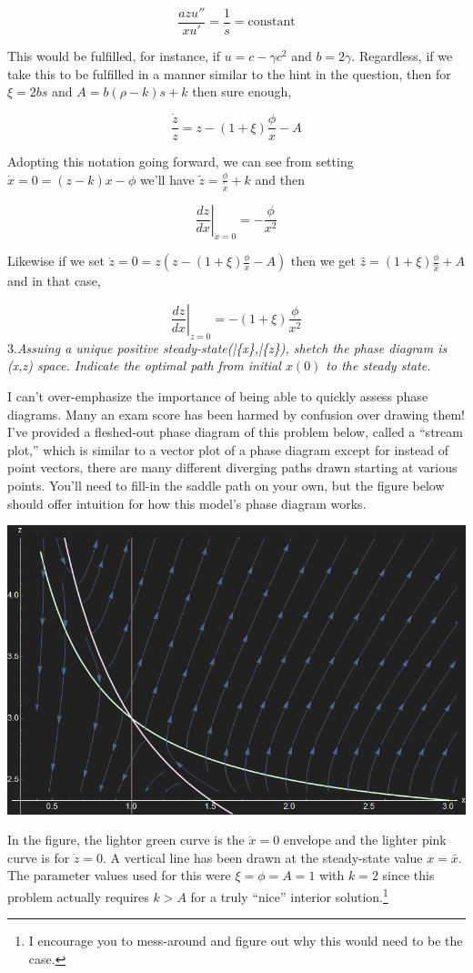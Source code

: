 \documentclass[
]{article}
\begin{document}
\[ \frac{azu''}{xu'} = \frac{1}{s} = \text{constant}\]

This would be fulfilled, for instance, if \(u = c - \gamma c^2\) and
\(b = 2\gamma\). Regardless, if we take this to be fulfilled in a manner
similar to the hint in the question, then for \(\xi = 2bs\) and
\(A=b(\rho - k)s + k\) then sure enough,

\[\frac{\dot{z}}{z} = z - (1+\xi)\frac{\phi}{x} - A\]

Adopting this notation going forward, we can see from setting
\(\dot{x} = 0 = (z - k)x - \phi\) we'll have
\(\tilde{z}= \frac{\phi}{\tilde{x}} + k\) and then

\[ \left. \frac{dz}{dx} \right\rvert_{\dot{x} = 0} = -\frac{\phi}{x^2}\]

Likewise if we set \(\dot{z} = 0 = z(z - (1+\xi)\frac{\phi}{x} - A)\)
then we get \(\hat{z}= (1+\xi)\frac{\phi}{\hat{x}} + A\) and in that
case,

\[ \left. \frac{dz}{dx} \right\rvert_{\dot{z} = 0} = -(1+\xi)\frac{\phi}{x^2}\]
3.\emph{Assuing a unique positive steady-state(\bar\{x\},\bar\{z\}),
shetch the phase diagram is (x,z) space. Indicate the optimal path from
initial \(x(0)\) to the steady state.}

I can't over-emphasize the importance of being able to quickly assess
phase diagrams. Many an exam score has been harmed by confusion over
drawing them! I've provided a fleshed-out phase diagram of this problem
below, called a ``stream plot,'' which is similar to a vector plot of a
phase diagram except for instead of point vectors, there are many
different diverging paths drawn starting at various points. You'll need
to fill-in the saddle path on your own, but the figure below should
offer intuition for how this model's phase diagram works.

\begin{center}\includegraphics[width=0.8\linewidth,height=0.8\textheight]{phaseplot_dark} \end{center}

In the figure, the lighter green curve is the \(\dot{x} = 0\) envelope
and the lighter pink curve is for \(\dot{z}=0\). A vertical line has
been drawn at the steady-state value \(x=\bar{x}\). The parameter values
used for this were \(\xi = \phi = A = 1\) with \(k = 2\) since this
problem actually requires \(k > A\) for a truly ``nice'' interior
solution.\footnote{I encourage you to mess-around and figure out why
  this would need to be the case.}
\end{document}
